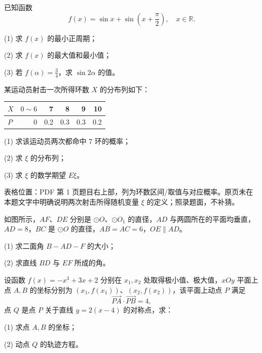 \begin{question}
已知函数
\nopagebreak[4]
\[
f(x)=\sin x+\sin\left(x+\frac{\pi}{2}\right),\quad x\in\mathbb R.
\]

(1) 求 \(f(x)\) 的最小正周期；

(2) 求 \(f(x)\) 的最大值和最小值；

(3) 若 \(f(\alpha)=\frac34\)，求 \(\sin 2\alpha\) 的值。

\end{question}
\begin{question}
某运动员射击一次所得环数 \(X\) 的分布列如下：

\begin{center}
\begin{tabular}{lrrrrr}
\toprule
\(X\) & \(0\sim6\) & 7 & 8 & 9 & 10 \\
\midrule
\(P\) & 0 & 0.2 & 0.3 & 0.3 & 0.2 \\
\bottomrule
\end{tabular}
\end{center}

(1) 求该运动员两次都命中 7 环的概率；

(2) 求 \(\xi\) 的分布列；

(3) 求 \(\xi\) 的数学期望 \(E\xi\)。

\begin{gktip}
表格位置：PDF 第 1 页题目右上部，列为环数区间/取值与对应概率。原页未在本题文字中明确说明两次射击所得随机变量 \(\xi\) 的定义；照录题面，不补猜。
\end{gktip}

\Needspace{0.4\textheight}
\end{question}
\begin{question}
如图所示，\(AF\)、\(DE\) 分别是 \(\odot O\)、\(\odot O_1\) 的直径，\(AD\) 与两圆所在的平面均垂直，\(AD=8\)，\(BC\) 是 \(\odot O\) 的直径，\(AB=AC=6\)，\(OE\parallel AD\)。

(1) 求二面角 \(B-AD-F\) 的大小；

(2) 求直线 \(BD\) 与 \(EF\) 所成的角。
\nopagebreak[4]
\begin{center}\end{center}
\nopagebreak[4]
\end{question}
\begin{question}
设函数 \(f(x)=-x^3+3x+2\) 分别在 \(x_1,x_2\) 处取得极小值、极大值，\(xOy\) 平面上点 \(A,B\) 的坐标分别为 \((x_1,f(x_1))\)、\((x_2,f(x_2))\)，该平面上动点 \(P\) 满足
\nopagebreak[4]
\[
\overrightarrow{PA}\cdot\overrightarrow{PB}=4,
\]
点 \(Q\) 是点 \(P\) 关于直线 \(y=2(x-4)\) 的对称点，求：

(1) 求点 \(A,B\) 的坐标；

(2) 动点 \(Q\) 的轨迹方程。

\end{question}
